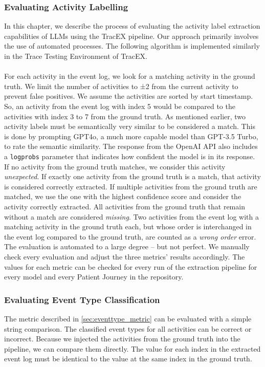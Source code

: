 \subsubsection{Evaluating Activity Labelling}\label{sec:eval_activity}
In this chapter, we describe the process of evaluating the activity label extraction capabilities of LLMs using the TracEX pipeline. Our approach primarily involves the use of automated processes. The following algorithm is implemented similarly in the Trace Testing Environment of TracEX.\\\\
For each activity in the event log, we look for a matching activity in the ground truth. We limit the number of activities to ±2 from the current activity to prevent false positives. We assume the activities are sorted by start timestamp. So, an activity from the event log with index 5 would be compared to the activities with index 3 to 7 from the ground truth. As mentioned earlier, two activity labels must be semantically very similar to be considered a match. This is done by prompting GPT4o, a much more capable model than GPT-3.5 Turbo, to rate the semantic similarity. The response from the OpenAI API also includes a \verb|logprobs| parameter that indicates how confident the model is in its response. If no activity from the ground truth matches, we consider this activity \emph{unexpected}. If exactly one activity from the ground truth is a match, that activity is considered correctly extracted. If multiple activities from the ground truth are matched, we use the one with the highest confidence score and consider the activity correctly extracted.  All activities from the ground truth that remain without a match are considered \emph{missing}. Two activities from the event log with a matching activity in the ground truth each, but whose order is interchanged in the event log compared to the ground truth, are counted as a \emph{wrong order} error.\\
The evaluation is automated to a large degree – but not perfect. We manually check every evaluation and adjust the three metrics' results accordingly. The values for each metric can be checked for every run of the extraction pipeline for every model and every Patient Journey in the repository.

\subsubsection{Evaluating Event Type Classification}\label{sec:eval_event_type}
The metric described in \autoref{sec:eventtype_metric} can be evaluated with a simple string comparison. The classified event types for all activities can be correct or incorrect. Because we injected the activities from the ground truth into the pipeline, we can compare them directly. The value for each index in the extracted event log must be identical to the value at the same index in the ground truth.

